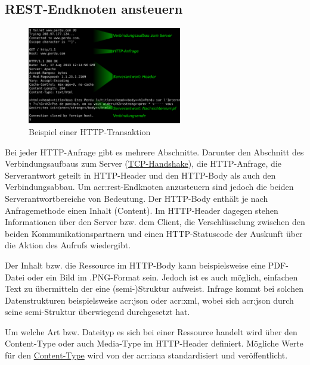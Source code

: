 \subsection{REST-Endknoten ansteuern}%
\label{sec:rest.ansteuern}

\begin{figure}
  \includegraphics[width=0.6\textwidth]{img/http-anfrage.png}
  \caption{Beispiel einer HTTP-Transaktion}
\end{figure}

Bei jeder HTTP-Anfrage gibt es mehrere Abschnitte. Darunter den Abschnitt des Verbindungsaufbaus zum Server (\href{http://www.rvs.uni-bielefeld.de/~heiko/tcpip/tcpip_html_alt/kap_2_4.html}{TCP-Handshake}), die HTTP-Anfrage, die Serverantwort geteilt in HTTP-Header und den HTTP-Body als auch den Verbindungsabbau. Um \acrshort{acr:rest}-Endknoten anzusteuern sind jedoch die beiden Serverantwortbereiche von Bedeutung. Der HTTP-Body enthält je nach Anfragemethode einen Inhalt (Content). Im HTTP-Header dagegen stehen Informationen über den Server bzw. dem Client, die Verschlüsselung zwischen den beiden Kommunikationspartnern und einen HTTP-Statuscode der Auskunft über die Aktion des Aufrufs wiedergibt.

Der Inhalt bzw. die Ressource im HTTP-Body kann beispielsweise eine PDF-Datei oder ein Bild im .PNG-Format sein. Jedoch ist es auch möglich, einfachen Text zu übermitteln der eine (semi-)Struktur aufweist. Infrage kommt bei solchen Datenstrukturen beispielsweise \acrfull{acr:json} oder \acrfull{acr:xml}, wobei sich \acrshort{acr:json} durch seine semi-Struktur überwiegend durchgesetzt hat.

Um welche Art bzw. Dateityp es sich bei einer Ressource handelt wird über den Content-Type oder auch Media-Type im HTTP-Header definiert. Mögliche Werte für den \href{http://www.iana.org/assignments/media-types/media-types.xhtml}{Content-Type} wird von der \acrfull{acr:iana} standardisiert und veröffentlicht.

